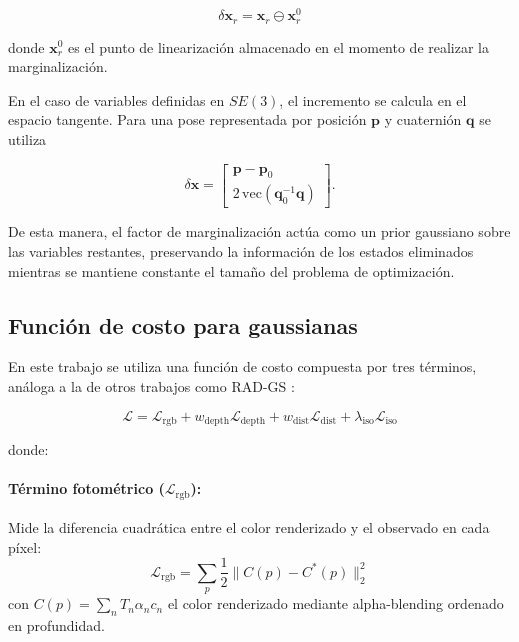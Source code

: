 \begin{equation}
\delta\mathbf{x}_r =
\mathbf{x}_r \ominus \mathbf{x}_r^0
\end{equation}

\noindent donde $\mathbf{x}_r^0$ es el punto de linearización almacenado en el momento de 
realizar la marginalización.

En el caso de variables definidas en $SE(3)$, el incremento se calcula en el 
espacio tangente. Para una pose representada por posición $\mathbf{p}$ y 
cuaternión $\mathbf{q}$ se utiliza

\begin{equation}
\delta\mathbf{x} =
\begin{bmatrix}
\mathbf{p}-\mathbf{p}_0 \\
2\,\mathrm{vec}
\left(
\mathbf{q}_0^{-1}\mathbf{q}
\right)
\end{bmatrix}.
\end{equation}

De esta manera, el factor de marginalización actúa como un prior gaussiano 
sobre las variables restantes, preservando la información de los estados 
eliminados mientras se mantiene constante el tamaño del problema de optimización.





\subsection{Función de costo para gaussianas}

En este trabajo se utiliza una función de costo compuesta por tres términos, análoga a la de otros trabajos como RAD-GS \cite{radgs}:

\begin{equation}
\mathcal{L} = \mathcal{L}_{\text{rgb}} + w_{\text{depth}} \mathcal{L}_{\text{depth}} + w_{\text{dist}} \mathcal{L}_{\text{dist}} + \lambda_{\text{iso}} \mathcal{L}_{\text{iso}}
\end{equation}

\noindent donde:

\paragraph{Término fotométrico ($\mathcal{L}_{\text{rgb}}$):}
Mide la diferencia cuadrática entre el color renderizado y el observado en cada píxel:
\begin{equation}
\mathcal{L}_{\text{rgb}} = \sum_{p} \frac{1}{2}\|C(p) - C^*(p)\|_2^2
\end{equation}
con $C(p) = \sum_n T_n \alpha_n c_n$ el color renderizado mediante alpha-blending ordenado en profundidad.

